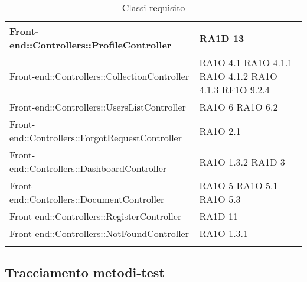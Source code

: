 \begin{center}
\begin{longtable}{ | p{11cm} | p{3cm} | }
	Front-end::Controllers::ProfileController &  RA1D 13 \\ \hline
	
	Front-end::Controllers::CollectionController & RA1O 4.1 \newline RA1O 4.1.1 \newline RA1O 4.1.2 \newline RA1O 4.1.3 \newline RF1O 9.2.4 \\ \hline
	
	Front-end::Controllers::UsersListController & RA1O 6 \newline RA1O 6.2 \\ \hline
	
	Front-end::Controllers::ForgotRequestController & RA1O 2.1 \\ \hline
	
	Front-end::Controllers::DashboardController &  RA1O 1.3.2 \newline RA1D 3 \\ \hline
	
	Front-end::Controllers::DocumentController & RA1O 5 \newline RA1O 5.1 \newline RA1O 5.3 \\ \hline
	
	Front-end::Controllers::RegisterController & RA1D 11 \\ \hline
	
	Front-end::Controllers::NotFoundController & RA1O 1.3.1 \\ \hline
	

	\caption{Classi-requisito}
      \end{longtable}
      \egroup
      \end{center}  
\clearpage

\subsection{Tracciamento metodi-test}
   